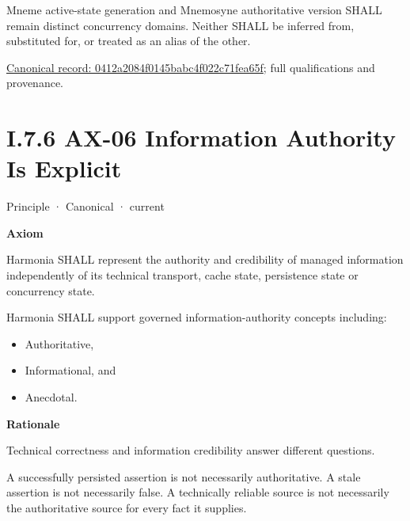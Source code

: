 Mneme active-state generation and Mnemosyne authoritative version SHALL remain distinct concurrency domains. Neither SHALL be inferred from, substituted for, or treated as an alias of the other.


{\footnotesize \href{../../../../continuum/motivation/principle/0412a2084f0145babc4f022c71fea65f.md}{Canonical record: 0412a2084f0145babc4f022c71fea65f}; full qualifications and provenance.}\par
\section*{I.7.6 AX-06 Information Authority Is Explicit}
\label{navigation:I.7.6}

\label{element:952c3b6148ce4fce94b69f99a0c2fec7}
{\small Principle · Canonical · current}\par

\par\medskip\textbf{Axiom}\par


Harmonia SHALL represent the authority and credibility of managed
information independently of its technical transport, cache state,
persistence state or concurrency state.



Harmonia SHALL support governed information-authority concepts including:



\begin{itemize}


\item Authoritative,

\item Informational, and

\item Anecdotal.

\end{itemize}


\par\medskip\textbf{Rationale}\par


Technical correctness and information credibility answer different
questions.



A successfully persisted assertion is not necessarily authoritative. A
stale assertion is not necessarily false. A technically reliable source
is not necessarily the authoritative source for every fact it supplies.



